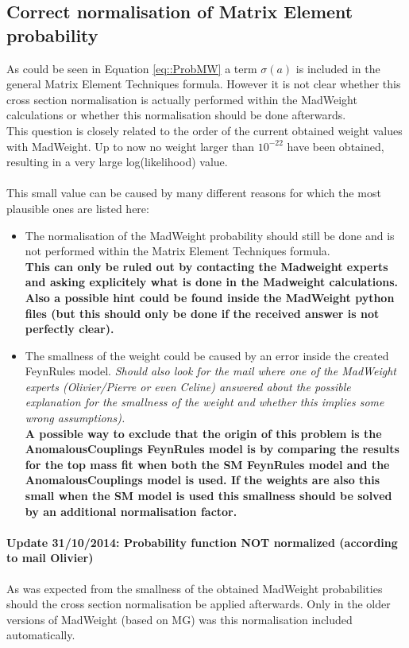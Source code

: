 \subsection{Correct normalisation of Matrix Element probability}
As could be seen in Equation \ref{eq::ProbMW} a term $\sigma(a)$ is included in the general Matrix Element Techniques formula. However it is not clear whether this cross section normalisation is actually performed within the MadWeight calculations or whether this normalisation should be done afterwards.\\
This question is closely related to the order of the current obtained weight values with MadWeight. Up to now no weight larger than $10^{-22}$ have been obtained, resulting in a very large log(likelihood) value. \\
\\
This small value can be caused by many different reasons for which the most plausible ones are listed here:
\begin{itemize}
 \item The normalisation of the MadWeight probability should still be done and is not performed within the Matrix Element Techniques formula.\\ \textbf{This can only be ruled out by contacting the Madweight experts and asking explicitely what is done in the Madweight calculations. Also a possible hint could be found inside the MadWeight python files (but this should only be done if the received answer is not perfectly clear).}
 \item The smallness of the weight could be caused by an error inside the created FeynRules model. \textit{Should also look for the mail where one of the MadWeight experts (Olivier/Pierre or even Celine) answered about the possible explanation for the smallness of the weight and whether this implies some wrong assumptions).}\\ \textbf{A possible way to exclude that the origin of this problem is the AnomalousCouplings FeynRules model is by comparing the results for the top mass fit when both the SM FeynRules model and the AnomalousCouplings model is used. If the weights are also this small when the SM model is used this smallness should be solved by an additional normalisation factor.}
\end{itemize}

\paragraph{Update 31/10/2014: Probability function NOT normalized (according to mail Olivier)\\}
As was expected from the smallness of the obtained MadWeight probabilities should the cross section normalisation be applied afterwards. Only in the older versions of MadWeight (based on MG) was this normalisation included automatically.

